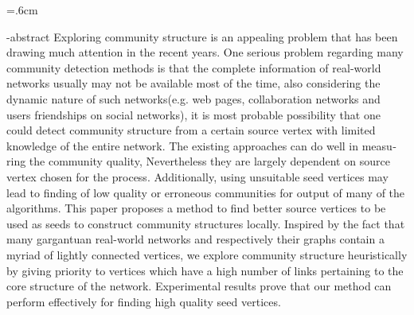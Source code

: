 
\baselineskip=.6cm
\begin{latin}
 

\en-abstract{
Exploring community structure is an appealing problem that has been 
drawing much attention in the recent years. One serious problem regarding 
many community detection methods is that the complete information of real-world
networks usually may not be available most of the time, also considering the
dynamic nature of such networks(e.g. web pages, collaboration networks and
users friendships on social networks), it is most probable possibility that
one could detect community structure from a certain source vertex with limited
knowledge of the entire network. The existing approaches can do well in measuring
the community quality, Nevertheless they are largely dependent on source vertex
chosen for the process. Additionally, using unsuitable seed vertices may lead to
finding of low quality or erroneous communities for output of many of the algorithms.
This paper proposes a method to find better source vertices to be used as seeds to
construct community structures locally. Inspired by the fact that many gargantuan 
real-world networks and respectively their graphs contain a myriad of lightly
connected vertices, we explore community structure heuristically by giving
priority to vertices which have a high number of links pertaining to the
core structure of the network. Experimental results prove that our method
can perform effectively for finding high quality seed vertices.
}
\latinfirstPage
\end{latin}
